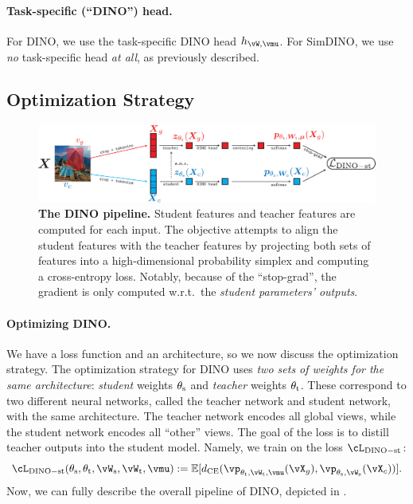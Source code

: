 \documentclass[../../book-main.tex]{subfiles}
\begin{document}
\paragraph{Task-specific (``DINO'') head.} For DINO, we use the task-specific DINO head \(h_{\vW, \vmu}\). For SimDINO, we use \textit{no} task-specific head \textit{at all}, as previously described.

\subsection{Optimization Strategy}\label{sub:contrastive_learning_optimization}

\begin{figure}
    \centering 
    \includegraphics[width=\textwidth]{chapters/chapter7/figs/dino_pipeline.pdf}
    \caption{\small \textbf{The DINO pipeline.} Student features and teacher features are computed for each input. The objective attempts to align the student features with the teacher features by projecting both sets of features into a high-dimensional probability simplex and computing a cross-entropy loss. Notably, because of the ``stop-grad'', the gradient is only computed w.r.t.~the \textit{student parameters' outputs}.}
    \label{fig:dino_pipeline}
\end{figure}

\paragraph{Optimizing DINO.} We have a loss function and an architecture, so we now discuss the optimization strategy. The optimization strategy for DINO uses \textit{two sets of weights for the same architecture}: \textit{student} weights \(\theta_{\mathrm{s}}\) and \textit{teacher} weights \(\theta_{\mathrm{t}}\). These correspond to two different neural networks, called the teacher network and student network, with the same architecture. The teacher network encodes all global views, while the student network encodes all ``other'' views. The goal of the loss is to distill teacher outputs into the student model. Namely, we train on the loss \(\cL_{\dino{}-\student\teacher}\):
\begin{equation}\label{eq:dino_loss_teacherstudent}
    \cL_{\dino{}-\student\teacher}(\theta_{\student}, \theta_{\teacher}, \vW_{\student}, \vW_{\teacher}, \vmu) := \Ex[d_{\CE}(\vp_{\theta_{\teacher}, \vW_{\teacher}, \vmu}(\vX_{g}), \vp_{\theta_{\student}, \vW_{\student}}(\vX_{c}))].
\end{equation}
Now, we can fully describe the overall pipeline of DINO, depicted in .
\end{document}
